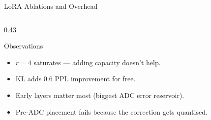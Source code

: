 \begin{frame}[shrink=15]{LoRA Ablations and Overhead}
\begin{columns}[T]
\begin{column}{0.43\textwidth}
      \vspace{0.7em}
      \pause
      \begin{alertblock}{Observations}
        \scriptsize
        \begin{itemize}
          \item $r{=}4$ saturates — adding capacity doesn\rq{}t help.
          \item KL adds 0.6 PPL improvement for free.
          \item Early layers matter most (biggest ADC error reservoir).
          \item Pre-ADC placement fails because the correction gets quantised.
        \end{itemize}
      \end{alertblock}
    \end{column}
  \end{columns}
\end{frame}
